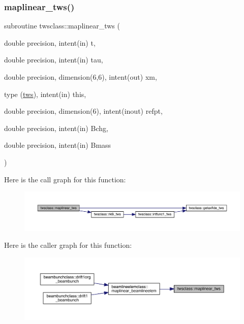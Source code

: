 \subsubsection{\texorpdfstring{maplinear\_tws()}{maplinear\_tws()}}
{\footnotesize\ttfamily subroutine twsclass\+::maplinear\+\_\+tws (\begin{DoxyParamCaption}\item[{double precision, intent(in)}]{t,  }\item[{double precision, intent(in)}]{tau,  }\item[{double precision, dimension(6,6), intent(out)}]{xm,  }\item[{type (\mbox{\hyperlink{namespacetwsclass_structtwsclass_1_1tws}{tws}}), intent(in)}]{this,  }\item[{double precision, dimension(6), intent(inout)}]{refpt,  }\item[{double precision, intent(in)}]{Bchg,  }\item[{double precision, intent(in)}]{Bmass }\end{DoxyParamCaption})}

Here is the call graph for this function\+:\nopagebreak
\begin{figure}[H]
\begin{center}
\leavevmode
\includegraphics[width=350pt]{namespacetwsclass_ab57cbdca9514adc28eb62c6bbb8633b6_cgraph}
\end{center}
\end{figure}
Here is the caller graph for this function\+:\nopagebreak
\begin{figure}[H]
\begin{center}
\leavevmode
\includegraphics[width=350pt]{namespacetwsclass_ab57cbdca9514adc28eb62c6bbb8633b6_icgraph}
\end{center}
\end{figure}
\mbox{\label{namespacetwsclass_a2d527684d5c9fd42e3217ac03914bd90}} 
